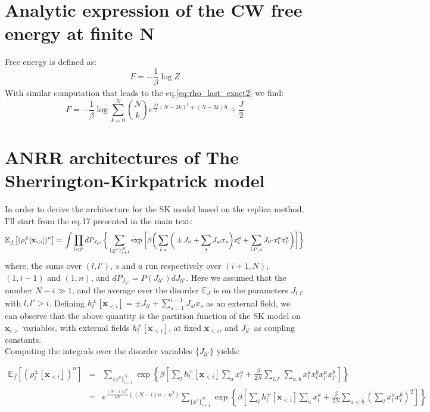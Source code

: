 \documentclass[10pt, notitlepage]{revtex4-2}
\begin{document}
\section{Analytic expression of the CW free energy at finite N}
Free energy is defined as:
\begin{equation}
F = -\frac{1}{\beta} \log Z
\end{equation}
With similar computation that leads to the eq.\ref{eq:rho_last_exact2} we find:
\begin{equation}
F = -\frac{1}{\beta}\log \sum_{k=0}^{N} \binom{N}{k}e^{\frac{\beta J}{2}\left(N-2k\right)^{2}+\left(N-2k\right)h}  + \frac{J}{2}
\end{equation}

\section{ANRR architectures of The Sherrington-Kirkpatrick model}
In order to derive the architecture for the SK model based on the replica method, I'll start from the eq.17 presented in the main text:
\begin{equation}
\mathbb{E}_{\underline{J}}\left[(\rho_i^{\pm}[\mathbf{x}_{<i}])^n \right]  = \\
\int \prod_{l<l'} dP_{J_{ll'}} \bigg\{ 
\sum_{\{\underline{x}^{a}\}_{i+1}^N} \exp\bigg[\beta \bigg(
\sum_{l,a}\bigg( \pm J_{il} + \sum_{s} J_{sl} x_s \bigg) x_l^{a} + 
\sum_{l,l', a} J_{ll'} x_l^{a} x_{l'}^{a}
\bigg)  \bigg] 
\bigg\}
\end{equation}
where, the sums over $(l,l')$, $s$ and $a$ run respectively over $(i+1,N)$, $(1,i-1)$ and $(1,n)$, and $dP_{J_{ll'}}=P(J_{ll'})dJ_{ll'}$. Here we assumed that the number $N-i \gg 1$, and the average over the disorder $\mathbb{E}_{\underline{J}}$ is on the parameters $J_{l,l'}$ with $l,l'>i$. Defining $h_l^{\pm}[\mathbf{x}_{<i}] =\pm J_{il} + \sum_{s=1}^{i-1} J_{sl} x_s$ as an external field, we can observe that the above quantity is the partition function of the SK model on $\mathbf{x}_{i>}$ variables, with external fields $h_l^{\pm}[\mathbf{x}_{<i}]$, at fixed $\mathbf{x}_{<i}$, and $J_{ll'}$ as coupling constants. \\  
Computing the integrals over the disorder variables $\{J_{ll'}\}$ yields:
\begin{widetext}
\begin{eqnarray}
\mathbb{E}_{\underline{J}}\left[(\rho_i^{\pm}[\mathbf{x}_{<i}])^n \right] & = & 
\sum_{\{\underline{x}^{a}\}_{i+1}^N} 
\exp\left\{\beta \left[
\sum_{l} h_l^{\pm}[\mathbf{x}_{<i}] \sum_{a} x_l^{a} +\frac{\beta}{2N} \sum_{l,l'} \sum_{a,b} x_l^{a} x_l^{b} x_{l'}^{a}x_{l'}^{b} \right]  \right\} \\
& = & e^{ \frac{(N-i) \beta^2}{4N}((N-i)n-n^2) } 
\sum_{\{\underline{x}^{a}\}_{i+1}^N} 
\exp\left\{\beta \left[
\sum_{l} h_l^{\pm}[\mathbf{x}_{<i}] \sum_{a} x_l^{a} +\frac{\beta}{2N} \sum_{a<b} \left( \sum_{l}  x_l^{a} x_l^{b} \right)^2 \right]  \right\}
\end{eqnarray}
\end{widetext}
\end{document}
